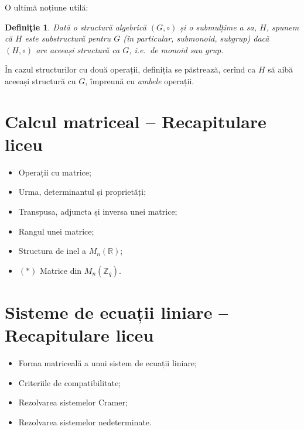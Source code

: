 \documentclass[11pt,a4paper]{article}
\newcommand\RR{\mathbb{R}}
\newcommand\ZZ{\mathbb{Z}}
\theoremstyle{dotless}
\theoremstyle{dotlessdr}
\newtheorem{definition}{Defini\c{t}ie}[section]
\begin{document}
O ultimă noțiune utilă:

\begin{definition}\label{def:substruct}
  Dată o structură algebrică $(G, \circ)$ și o submulțime a sa, $H$, spunem
  că $H$ este \emph{substructură} pentru $G$ (în particular, submonoid,
  subgrup) dacă $(H, \circ)$ are aceeași structură ca $G$, i.e.\ de monoid
  sau grup.
\end{definition}

În cazul structurilor cu două operații, definiția se păstrează, cerînd ca
$H$ să aibă aceeași structură cu $G$, împreună cu \emph{ambele} operații.


\section{Calcul matriceal -- Recapitulare liceu}

\begin{itemize}
  \item Operații cu matrice;
  \item Urma, determinantul și proprietăți;
  \item Transpusa, adjuncta și inversa unei matrice;
  \item Rangul unei matrice;
  \item Structura de inel a $M_n(\RR)$;
  \item $(\ast)$ Matrice din $M_n(\ZZ_q)$.
\end{itemize}


\section{Sisteme de ecuații liniare -- Recapitulare liceu}

\begin{itemize}
  \item Forma matriceală a unui sistem de ecuații liniare;
  \item Criteriile de compatibilitate;
  \item Rezolvarea sistemelor Cramer;
  \item Rezolvarea sistemelor nedeterminate.
\end{itemize}

\end{document}
